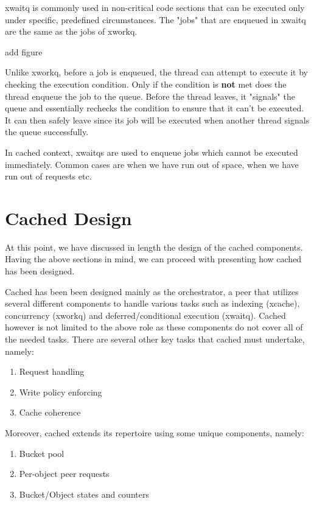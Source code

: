 xwaitq is commonly used in non-critical code sections that can be executed only 
under specific, predefined circumstances. The "jobs" that are enqueued in 
xwaitq are the same as the jobs of xworkq.

\fixme add figure

Unlike xworkq, before a job is enqueued, the thread can attempt to execute it 
by checking the execution condition. Only if the condition is \textbf{not} met 
does the thread enqueue the job to the queue. Before the thread leaves, it 
"signals" the queue and essentially rechecks the condition to ensure that it 
can't be executed. It can then safely leave since its job will be executed when 
another thread signals the queue successfully.

In cached context, xwaitqs are used to enqueue jobs which cannot be executed 
immediately. Common cases are when we have run out of space, when we have run 
out of requests etc.

\section{Cached Design}\label{sec:cached-design}

At this point, we have discussed in length the design of the cached components.  
Having the above sections in mind, we can proceed with presenting how cached 
has been designed.

Cached has been been designed mainly as the orchestrator, a peer that utilizes 
several different components to handle various tasks such as indexing (xcache), 
concurrency (xworkq) and deferred/conditional execution (xwaitq). Cached 
however is not limited to the above role as these components do not cover all 
of the needed tasks. There are several other key tasks that cached must 
undertake, namely:

\begin{enumerate}
	\item Request handling
	\item Write policy enforcing
	\item Cache coherence
\end{enumerate}

Moreover, cached extends its repertoire using some unique components, namely:

\begin{enumerate}
	\item Bucket pool
	\item Per-object peer requests
	\item Bucket/Object states and counters
\end{enumerate}

